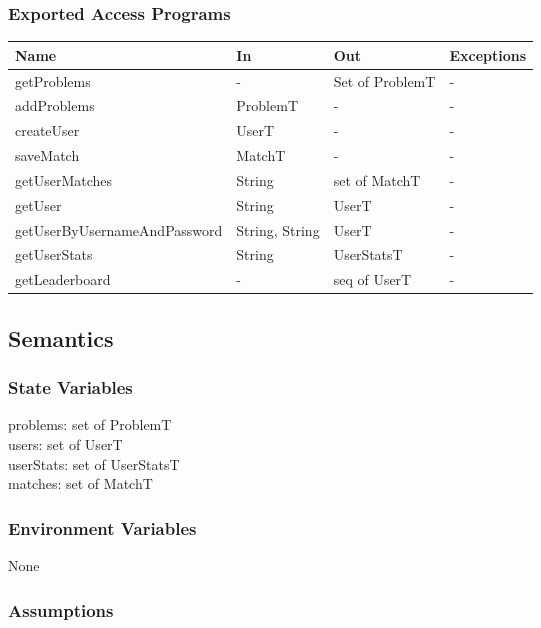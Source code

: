 \documentclass[12pt, titlepage]{article}
\begin{document}
\subsubsection{Exported Access Programs}

\begin{center}
\begin{tabular}{p{3cm} p{2cm} p{2cm} p{2cm}}
\hline
\textbf{Name} & \textbf{In} & \textbf{Out} & \textbf{Exceptions} \\
\hline
getProblems & - & Set of ProblemT & - \\
addProblems & ProblemT & - & - \\
createUser & UserT & - & - \\
saveMatch & MatchT & - & - \\
getUserMatches & String & set of MatchT & - \\
getUser & String & UserT & - \\
getUserByUsernameAndPassword & String, String & UserT & - \\
getUserStats & String & UserStatsT & - \\
getLeaderboard & - & seq of UserT & - \\
\hline
\end{tabular}
\end{center}

\subsection{Semantics}

\subsubsection{State Variables}

problems: set of ProblemT\\
users: set of UserT\\
userStats: set of UserStatsT\\
matches: set of MatchT\\


\subsubsection{Environment Variables}

None

\subsubsection{Assumptions}
\end{document}
